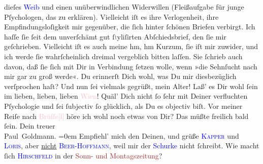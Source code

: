                dieſes \textcolor{blue}{Weib}{} und einen
               unüberwindlichen Widerwillen (Fleißaufgabe für junge Pſychologen, das zu erklären).
                  {\pb}Vielleicht iſt es ihre Verlogenheit, ihre
               Empfindungsloſigkeit mir gegenüber, die ſich hinter ſchönen Briefen verbirgt. Ich
               haſſe ſie ſeit dem unverſchämt gut ſ\textcolor{gray}{t}yliſirten Abſchiedsbrief, den
               ſie mir geſchrieben. Vielleicht iſt es auch meine {\dotsfour} hm, hm
                  {\dotsfour} Kurzum, ſie iſt mir zuwider, und ich werde ſie
               wahrſcheinlich dreimal vergeblich bitten laſſen. Sie ſchrieb auch davon, daß ſie ſich
               mit Dir in Verbindung ſetzen wolle, wenn »die Sehnſucht nach  mir gar zu groß werde«. Du
               erinnerſt Dich wohl, was Du mir diesbezüglich verſprochen haſt? {\dotsfour}\pend
           \pstart
           Und nun ſei vielmals gegrüßt, mein Alter! Laß’ es Dir wohl ſein im lieben, lieben,
               lieben \textcolor{pink}{Wien}{}\ledrightnote{\textcolor{pink}{Wien}}! Quäl’ {\pb}Dich nicht ſo ſehr mit Deiner verfluchten
               Pſychologie und ſei ſubjectiv ſo glücklich, als Du es objectiv biſt.\pend
           \pstart
           Vor meiner Reiſe nach \textcolor{pink}{Brüſſe{[}l{]}}{}\ledrightnote{\textcolor{pink}{Brüssel}} höre ich wohl noch etwas von Dir? Das müßte freilich bald ſein.\pend
           \pstart
           Dein treuer {\\[\baselineskip]}\spacefill\mbox{Paul Goldmann.}\pend
           \leftskip=0em{}\pstart
           \noindent{}Empfiehl’ mich den Deinen, und grüße \textsc{\textcolor{blue}{Kapper}{}\ledrightnote{\textcolor{blue}{Friedrich Kapper}}} und \textsc{\textcolor{blue}{Loris}{}\ledrightnote{\textcolor{blue}{Hugo von Hofmannsthal}}}, aber \uline{nicht}{ }\textsc{\textcolor{blue}{Beer-Hoffmann}{}\ledrightnote{\textcolor{blue}{Richard Beer-Hofmann}}}, weil mir der \textcolor{blue}{Schurke}{} nicht ſchreibt. Wie macht ſich \textsc{\textcolor{blue}{Hirschfeld}{}\ledrightnote{\textcolor{blue}{Robert Hirschfeld}}} in der \textcolor{brown}{Sonn- und Montagszeitung}{}\ledrightnote{\textcolor{brown}{Wiener Sonn- und Montagszeitung}}?\pend
           \endnumbering{}\begin{anhang}\end{anhang}
      